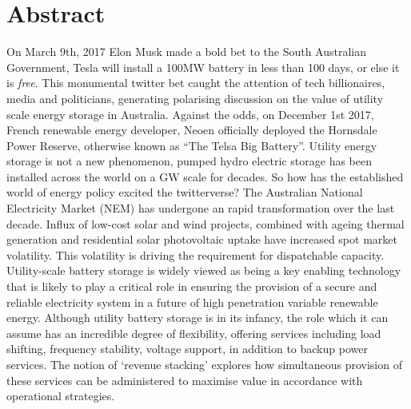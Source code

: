 \documentclass[11pt,fleqn]{book} %
\begin{document}
\chapter*{Abstract}
On March 9th, 2017 Elon Musk made a bold bet to the South Australian Government, Tesla will install a 100MW battery in less than 100 days, or else it is \textit{free}. This monumental twitter bet caught the attention of tech billionaires, media and politicians, generating polarising discussion on the value of utility scale energy storage in Australia. Against the odds, on December 1st 2017, French renewable energy developer, Neoen officially deployed the Hornsdale Power Reserve, otherwise known as ``The Telsa Big Battery''. Utility energy storage is not a new phenomenon, pumped hydro electric storage has been installed across the world on a GW scale for decades. So how has the established world of energy policy excited the twitterverse? 
\newline
\newline
The Australian National Electricity Market (NEM) has undergone an rapid transformation over the last decade. Influx of low-cost solar and wind projects, combined with ageing thermal generation and residential solar photovoltaic uptake have increased spot market volatility. This volatility is driving the requirement for dispatchable capacity. Utility-scale battery storage is widely viewed as being a key enabling
technology that is likely to play a critical role in
ensuring the provision of a secure and reliable
electricity system in a future of high penetration
variable renewable energy. Although utility battery storage is in its infancy, the role which it can assume has an incredible degree of flexibility, offering services including load shifting, frequency stability, voltage support, in addition to backup power services. The notion of `revenue stacking' explores how simultaneous provision of these services can be administered to maximise value in accordance with operational strategies.
\newline
\newline
\end{document}
